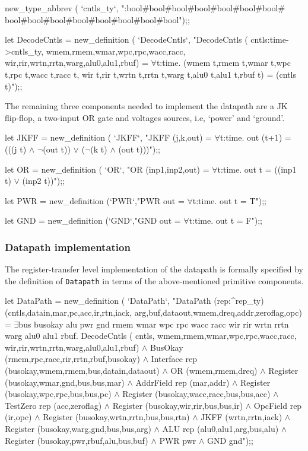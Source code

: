 \begintt
new_type_abbrev (
  `cntls_ty`,
  ":bool#bool#bool#bool#bool#bool#bool#
    bool#bool#bool#bool#bool#bool#bool#bool");;

let DecodeCntls = new_definition (
  `DecodeCntls`,
  "DecodeCntls (
    cntls:time->cntls_ty,
    wmem,rmem,wmar,wpc,rpc,wacc,racc,
    wir,rir,wrtn,rrtn,warg,alu0,alu1,rbuf) =
    \(\forall\)t:time.
      (wmem t,rmem t,wmar t,wpc t,rpc t,wacc t,racc t,
       wir t,rir t,wrtn t,rrtn t,warg t,alu0 t,alu1 t,rbuf t) =
      (cntls t)");;
\endtt

The remaining three components needed to implement the datapath
are a JK flip-flop,
a two-input OR gate and voltages sources, i.e, `power' and `ground'.

\begintt
let JKFF = new_definition (
  `JKFF`,
  "JKFF (j,k,out) =
    \(\forall\)t:time. out (t+1) = (((j t) \(\wedge\) \(\neg\)(out t))  \(\vee\) (\(\neg\)(k t) \(\wedge\) (out t)))");;

let OR = new_definition (
  `OR`,
  "OR (inp1,inp2,out) = \(\forall\)t:time. out t = ((inp1 t) \(\vee\) (inp2 t))");;

let PWR = new_definition (`PWR`,"PWR out = \(\forall\)t:time. out t = T");;

let GND = new_definition (`GND`,"GND out = \(\forall\)t:time. out t = F");;
\endtt

\subsubsection{Datapath implementation}

The register-transfer level implementation of the datapath
is formally specified by the definition of \verb"Datapath"
in terms of the above-mentioned primitive components.

\begintt
let DataPath = new_definition (
  `DataPath`,
  "DataPath (rep:^rep_ty)
    (cntls,datain,mar,pc,acc,ir,rtn,iack,
     arg,buf,dataout,wmem,dreq,addr,zeroflag,opc) =
    \(\exists\)bus busokay alu pwr gnd rmem wmar wpc rpc
     wacc racc wir rir wrtn rrtn warg alu0 alu1 rbuf.
      DecodeCntls (
        cntls,
        wmem,rmem,wmar,wpc,rpc,wacc,racc,
        wir,rir,wrtn,rrtn,warg,alu0,alu1,rbuf) \(\wedge\)
      BusOkay (rmem,rpc,racc,rir,rrtn,rbuf,busokay) \(\wedge\)
      Interface rep (busokay,wmem,rmem,bus,datain,dataout) \(\wedge\)
      OR (wmem,rmem,dreq) \(\wedge\)
      Register (busokay,wmar,gnd,bus,bus,mar) \(\wedge\)
      AddrField rep (mar,addr) \(\wedge\)
      Register (busokay,wpc,rpc,bus,bus,pc) \(\wedge\)
      Register (busokay,wacc,racc,bus,bus,acc) \(\wedge\)
      TestZero rep (acc,zeroflag) \(\wedge\)
      Register (busokay,wir,rir,bus,bus,ir) \(\wedge\)
      OpcField rep (ir,opc) \(\wedge\)
      Register (busokay,wrtn,rrtn,bus,bus,rtn) \(\wedge\)
      JKFF (wrtn,rrtn,iack) \(\wedge\)
      Register (busokay,warg,gnd,bus,bus,arg) \(\wedge\)
      ALU rep (alu0,alu1,arg,bus,alu) \(\wedge\)
      Register (busokay,pwr,rbuf,alu,bus,buf) \(\wedge\)
      PWR pwr \(\wedge\)
      GND gnd");;
\endtt

